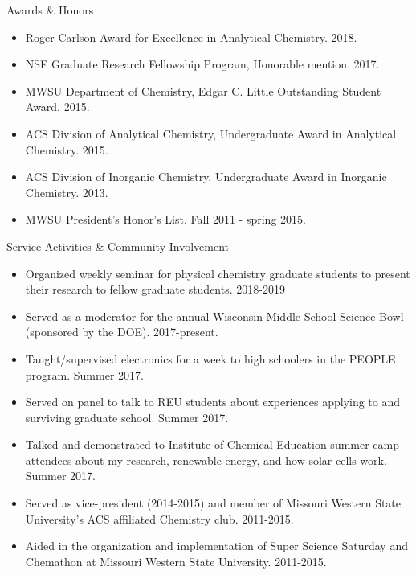 \documentclass{resume} %
\begin{document}
\begin{rSection}{Awards \& Honors}

\begin{itemize}[leftmargin = 0 pt]
	\item Roger Carlson Award for Excellence in Analytical Chemistry. 2018.
	\item NSF Graduate Research Fellowship Program, Honorable mention. 2017.
	\item MWSU Department of Chemistry, Edgar C. Little Outstanding Student Award. 2015.
	\item ACS Division of Analytical Chemistry, Undergraduate Award in Analytical Chemistry. 2015. 
	\item ACS Division of Inorganic Chemistry, Undergraduate Award in Inorganic Chemistry. 2013.
	\item MWSU President’s Honor’s List. Fall 2011 - spring 2015.
\end{itemize}
\end{rSection}



\begin{rSection}{Service Activities \& Community Involvement}

\begin{itemize}[leftmargin = 0 pt]
	\item Organized weekly seminar for physical chemistry graduate students to present their research to fellow graduate students. 2018-2019
	\item Served as a moderator for the annual Wisconsin Middle School Science Bowl (sponsored by the DOE). 2017-present.
	\item Taught/supervised electronics for a week to high schoolers in the PEOPLE program. Summer 2017.
	\item Served on panel to talk to REU students about experiences applying to and surviving graduate school. Summer 2017.
	\item Talked and demonstrated to Institute of Chemical Education summer camp attendees about my research, renewable energy, and how solar cells work. Summer 2017.  
	\item Served as vice-president (2014-2015) and member of Missouri Western State University's ACS affiliated Chemistry club. 2011-2015.
	\item Aided in the organization and implementation of Super Science Saturday and Chemathon at Missouri Western State University. 2011-2015.	
\end{itemize}
\end{rSection}
\end{document}
